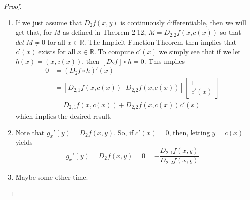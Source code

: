 \begin{enumerate}
    \begin{proof}
    \begin{enumerate}
        \item If we just assume that \( D_2f(x,y) \) is continuously differentiable, then we will get that, for \( M \) as defined in Theorem 2-12, \( M = D_{2,2}f(x,c(x)) \) so that \( det \: M \neq 0 \) for all \( x \in \mathbb{R} \). The Implicit Function Theorem then implies that \( c'(x) \) exists for all \( x \in \mathbb{R} \). To compute \( c'(x) \) we simply see that if we let \( h(x) = (x, c(x)) \), then \( [D_2f] \circ h = 0 \). This implies
        \begin{align*}
        0 &= \left( D_2 f \circ h \right)'(x) \\
        &= \left[ D_{2,1}f(x,c(x)) \;\; D_{2,2} f(x,c(x)) \right] \begin{bmatrix} 1 \\ c'(x) \end{bmatrix} \\
        &= D_{2,1}f(x,c(x)) + D_{2,2}f(x,c(x))c'(x)
        \end{align*}
        which implies the desired result.
        
        \item Note that \( g_x'(y) = D_2f(x,y) \). So, if \( c'(x) = 0 \), then, letting \( y = c(x) \) yields
        \[
        g_x'(y) = D_2f(x,y) = 0 = -\frac{D_{2,1}f(x,y)}{D_{2,2}f(x,y)}
        \]
        
        \item Maybe some other time.
    \end{enumerate}
    \end{proof}

\end{enumerate}
